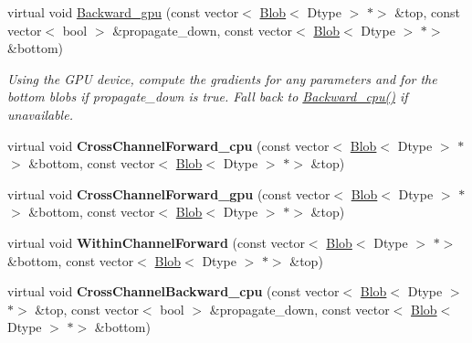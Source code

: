 \begin{DoxyCompactItemize}
virtual void \mbox{\hyperlink{classcaffe_1_1_l_r_n_layer_a11e0ab3313651275345a043bf2321f95}{Backward\+\_\+gpu}} (const vector$<$ \mbox{\hyperlink{classcaffe_1_1_blob}{Blob}}$<$ Dtype $>$ $\ast$$>$ \&top, const vector$<$ bool $>$ \&propagate\+\_\+down, const vector$<$ \mbox{\hyperlink{classcaffe_1_1_blob}{Blob}}$<$ Dtype $>$ $\ast$$>$ \&bottom)
\begin{DoxyCompactList}\small\item\em Using the G\+PU device, compute the gradients for any parameters and for the bottom blobs if propagate\+\_\+down is true. Fall back to \mbox{\hyperlink{classcaffe_1_1_l_r_n_layer_ac3f419feedaf79fc42d79af0d0f530ef}{Backward\+\_\+cpu()}} if unavailable. \end{DoxyCompactList}\item 
\mbox{\label{classcaffe_1_1_l_r_n_layer_a22621b8b8d82e9798db0174e4b80bd2a}} 
virtual void {\bfseries Cross\+Channel\+Forward\+\_\+cpu} (const vector$<$ \mbox{\hyperlink{classcaffe_1_1_blob}{Blob}}$<$ Dtype $>$ $\ast$$>$ \&bottom, const vector$<$ \mbox{\hyperlink{classcaffe_1_1_blob}{Blob}}$<$ Dtype $>$ $\ast$$>$ \&top)
\item 
\mbox{\label{classcaffe_1_1_l_r_n_layer_aa73f0b95b69aac2ee47be1e48756feeb}} 
virtual void {\bfseries Cross\+Channel\+Forward\+\_\+gpu} (const vector$<$ \mbox{\hyperlink{classcaffe_1_1_blob}{Blob}}$<$ Dtype $>$ $\ast$$>$ \&bottom, const vector$<$ \mbox{\hyperlink{classcaffe_1_1_blob}{Blob}}$<$ Dtype $>$ $\ast$$>$ \&top)
\item 
\mbox{\label{classcaffe_1_1_l_r_n_layer_a664a25da08521e604958d51f2986f29e}} 
virtual void {\bfseries Within\+Channel\+Forward} (const vector$<$ \mbox{\hyperlink{classcaffe_1_1_blob}{Blob}}$<$ Dtype $>$ $\ast$$>$ \&bottom, const vector$<$ \mbox{\hyperlink{classcaffe_1_1_blob}{Blob}}$<$ Dtype $>$ $\ast$$>$ \&top)
\item 
\mbox{\label{classcaffe_1_1_l_r_n_layer_a1c6b1999289500aff50fe5c75c35a655}} 
virtual void {\bfseries Cross\+Channel\+Backward\+\_\+cpu} (const vector$<$ \mbox{\hyperlink{classcaffe_1_1_blob}{Blob}}$<$ Dtype $>$ $\ast$$>$ \&top, const vector$<$ bool $>$ \&propagate\+\_\+down, const vector$<$ \mbox{\hyperlink{classcaffe_1_1_blob}{Blob}}$<$ Dtype $>$ $\ast$$>$ \&bottom)
\item 

\end{DoxyCompactItemize}
